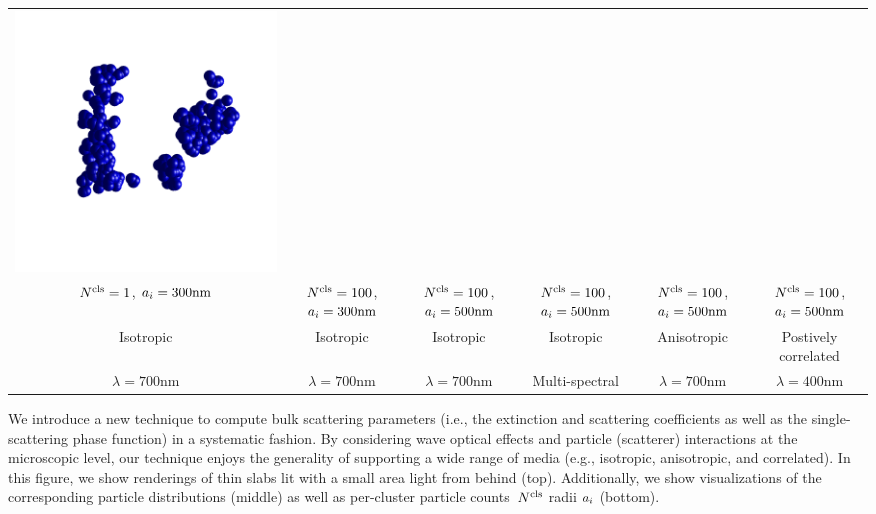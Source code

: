 \begin{teaserfigure}
\begin{tabular}{cccccc}
        \includegraphics[height=\resLen]{images/particle/pos.png}
        \\
        ${N^\text{cls}}=1$, $a_i=300\text{nm}$ &
        ${N^\text{cls}}=100$, $a_i=300\text{nm}$ &
        ${N^\text{cls}}=100$, $a_i=500\text{nm}$ &
        ${N^\text{cls}}=100$, $a_i=500\text{nm}$ & 
        ${N^\text{cls}}=100$, $a_i=500\text{nm}$ &
        ${N^\text{cls}}=100$, $a_i=500\text{nm}$
        \\
        Isotropic & Isotropic & Isotropic & Isotropic & Anisotropic & Postively correlated
        \\
        $\lambda=700\text{nm}$ &
        $\lambda=700\text{nm}$ &
        $\lambda=700\text{nm}$ &
        Multi-spectral &
        $\lambda=700\text{nm}$ &
        $\lambda=400\text{nm}$
    \end{tabular}
    \caption{\label{fig:teaser}
        We introduce a new technique to compute bulk scattering parameters (i.e., the extinction and scattering coefficients as well as the single-scattering phase function) in a systematic fashion. By considering wave optical effects and particle (scatterer) interactions at the microscopic level, our technique enjoys the generality of supporting a wide range of media (e.g., isotropic, anisotropic, and correlated).
        In this figure, we show renderings of thin slabs lit with a small area light from behind (top).
        Additionally, we show visualizations of the corresponding particle distributions (middle) as well as per-cluster particle counts~${N^\text{cls}}$ radii $a_i$ (bottom).
    }
\end{teaserfigure}
